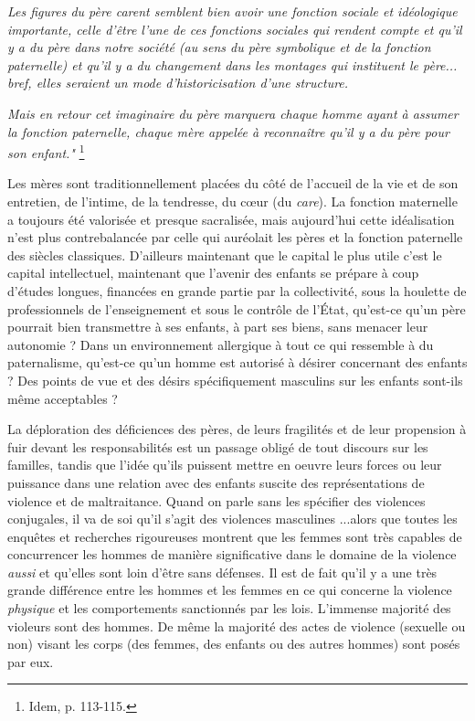 {\begin{displayquote}
\emph{Les figures du père carent semblent bien avoir une fonction sociale et idéologique importante, celle d'être l'une de ces fonctions sociales qui rendent compte et qu'il y a du père dans notre société (au sens du père symbolique et de la fonction paternelle) et qu'il y a du changement dans les montages qui instituent le père... bref, elles seraient un mode d'historicisation d'une structure.}

\emph{Mais en retour cet imaginaire du père marquera chaque homme ayant à assumer la fonction paternelle, chaque mère appelée à reconnaître qu'il y a du père pour son enfant."}%
\footnote{Idem, p. 113-115.}
\end{displayquote}

 Les mères  sont traditionnellement placées du côté de l'accueil de la vie et de son entretien, de l'intime, de la tendresse, du cœur (du \emph{care}). La fonction maternelle a toujours été valorisée et presque sacralisée, mais aujourd'hui cette idéalisation n'est plus contrebalancée par celle qui auréolait les pères et la fonction paternelle des siècles classiques. D'ailleurs maintenant que le capital le plus utile c'est le capital intellectuel, maintenant que l'avenir des enfants se prépare à coup d'études longues, financées en grande partie par la collectivité, sous la houlette de professionnels de l'enseignement et sous le contrôle de l'État, qu'est-ce qu'un père pourrait bien transmettre à ses enfants, à part ses biens, sans menacer leur autonomie ? Dans un environnement allergique à tout ce qui ressemble à du paternalisme, qu'est-ce qu'un homme est autorisé à désirer concernant des enfants ? Des points de vue et des désirs spécifiquement masculins sur les enfants sont-ils même acceptables ? 
 
 La déploration des déficiences des pères, de leurs fragilités et de leur propension à fuir devant les responsabilités est un passage obligé de tout discours sur les familles, tandis que l'idée qu'ils puissent mettre en oeuvre leurs forces ou leur puissance dans une relation avec des enfants suscite des représentations de violence et de maltraitance. Quand on parle sans les spécifier des violences conjugales, il va de soi qu'il s'agit des violences masculines ...alors que toutes les enquêtes et recherches rigoureuses montrent que les femmes sont très capables de concurrencer les hommes de manière significative dans le domaine de la violence \emph{aussi} et qu'elles sont loin d'être sans défenses. Il est de fait qu'il y a une très grande différence entre les hommes et les femmes en ce qui concerne la violence \emph{physique} et les comportements sanctionnés par les lois. L'immense majorité des violeurs sont des hommes. De même la majorité des actes de violence (sexuelle ou non) visant les corps (des femmes, des enfants ou des autres hommes) sont posés par eux.  
 
}
